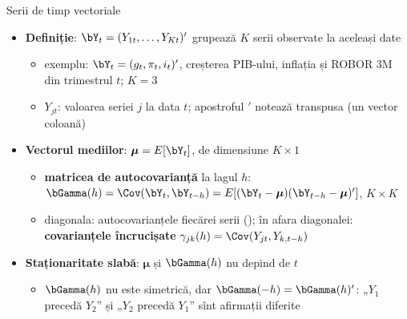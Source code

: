 \begin{frame}{Serii de timp vectoriale}
\itemsize{\small}
\begin{itemize}
    \item \textbf{Definiție}: $\bY_t = (Y_{1t}, \dots, Y_{Kt})'$ grupează $K$ serii observate la aceleași date
    \begin{itemize}
        \item exemplu: $\bY_t = (g_t, \pi_t, i_t)'$, creșterea PIB-ului, inflația și ROBOR 3M din trimestrul $t$; $K = 3$
        \item $Y_{jt}$: valoarea seriei $j$ la data $t$; apostroful $'$ notează transpusa (un vector coloană)
    \end{itemize}
    \item \textbf{Vectorul mediilor}: $\boldsymbol{\mu} = E[\bY_t]$, de dimensiune $K \times 1$
    \begin{itemize}
        \item \textbf{matricea de autocovarianță} la lagul $h$: $\bGamma(h) = \Cov(\bY_t, \bY_{t-h}) = E[(\bY_t - \boldsymbol{\mu})(\bY_{t-h} - \boldsymbol{\mu})']$, $K \times K$
        \item diagonala: autocovarianțele fiecărei serii (); în afara diagonalei: \textbf{covarianțele încrucișate} $\gamma_{jk}(h) = \Cov(Y_{jt}, Y_{k,t-h})$
    \end{itemize}
    \item \textbf{Staționaritate slabă}: $\boldsymbol{\mu}$ și $\bGamma(h)$ nu depind de $t$
    \begin{itemize}
        \item $\bGamma(h)$ nu este simetrică, dar $\bGamma(-h) = \bGamma(h)'$: „$Y_1$ precedă $Y_2$” și „$Y_2$ precedă $Y_1$” sînt afirmații diferite
    \end{itemize}
\end{itemize}
\end{frame}

